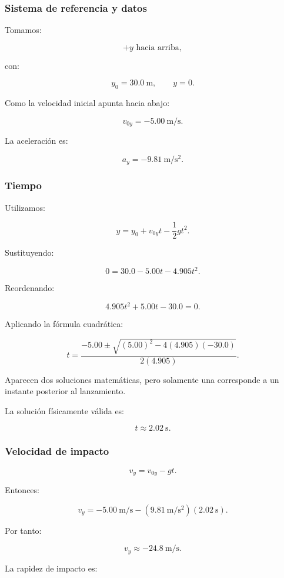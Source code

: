 \subsubsection*{Sistema de referencia y datos}

Tomamos:

\[
+y\text{ hacia arriba},
\]

con:

\[
y_0=\SI{30.0}{\meter},
\qquad
y=0.
\]

Como la velocidad inicial apunta hacia abajo:

\[ v_{0y}=-\SI{5.00}{\meter\per\second}. \]

La aceleración es:

\[ a_y=-\SI{9.81}{\meter\per\second\squared}. \]


\subsubsection*{Tiempo}

Utilizamos:

\[ y=y_0+v_{0y}t-\frac{1}{2}gt^2. \]

Sustituyendo:

\[
0
=
30.0
-
5.00t
-
4.905t^2.
\]

Reordenando:

\[ 4.905t^2+5.00t-30.0=0. \]

Aplicando la fórmula cuadrática:

\[
t
=
\frac{
-5.00\pm
\sqrt{(5.00)^2-4(4.905)(-30.0)}
}{
2(4.905)
}.
\]

Aparecen dos soluciones matemáticas, pero solamente una corresponde a un instante posterior al lanzamiento.

La solución físicamente válida es:

\[ \boxed{t\approx\SI{2.02}{\second}}. \]


\subsubsection*{Velocidad de impacto}

\[ v_y=v_{0y}-gt. \]

Entonces:

\[
v_y
=
-\SI{5.00}{\meter\per\second}
-
(\SI{9.81}{\meter\per\second\squared})
(\SI{2.02}{\second}).
\]

Por tanto:

\[ \boxed{v_y\approx-\SI{24.8}{\meter\per\second}}. \]

La rapidez de impacto es:

